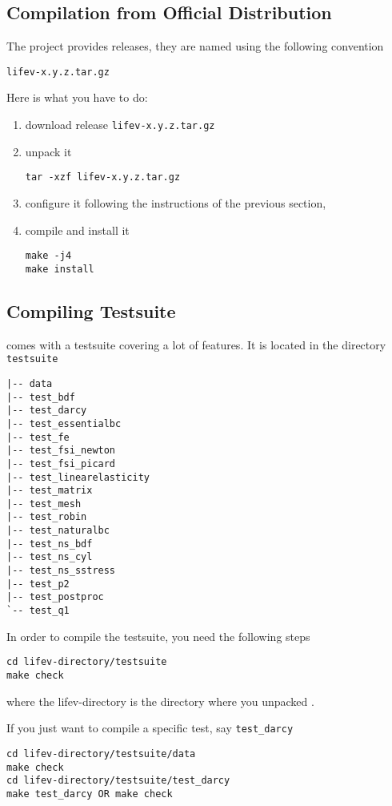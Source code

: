 \subsection{Compilation from Official Distribution}
\label{sec:comp-from-offic}
The \lifev project provides releases, they are named using the following convention
\begin{center}
\verb!lifev-x.y.z.tar.gz!
\end{center}

Here is what you have to do:

\begin{enumerate}
\item download \lifev release \verb!lifev-x.y.z.tar.gz!
\item unpack it
\begin{verbatim}
tar -xzf lifev-x.y.z.tar.gz
\end{verbatim}
\item configure it following the instructions of the previous section,
\item compile and install it
\begin{verbatim}
make -j4
make install
\end{verbatim}
\end{enumerate}


\subsection{Compiling Testsuite}

\noindent \lifev comes with a testsuite covering a lot of features. It is located in the directory \verb+testsuite+
\begin{verbatim}
|-- data
|-- test_bdf
|-- test_darcy
|-- test_essentialbc
|-- test_fe
|-- test_fsi_newton
|-- test_fsi_picard
|-- test_linearelasticity
|-- test_matrix
|-- test_mesh
|-- test_robin
|-- test_naturalbc
|-- test_ns_bdf
|-- test_ns_cyl
|-- test_ns_sstress
|-- test_p2
|-- test_postproc
`-- test_q1
\end{verbatim}

\noindent In order to compile the testsuite, you need the following steps
\begin{verbatim}
cd lifev-directory/testsuite
make check
\end{verbatim}
where the lifev-directory is the directory where you unpacked \lifev.

\noindent If you just want to compile a specific test, say \verb+test_darcy+
\begin{verbatim}
cd lifev-directory/testsuite/data
make check
cd lifev-directory/testsuite/test_darcy
make test_darcy OR make check
\end{verbatim}

%
%
